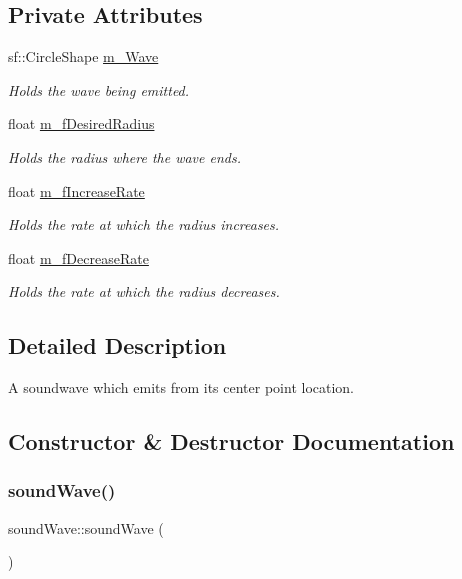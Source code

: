 \subsection*{Private Attributes}
\begin{DoxyCompactItemize}
\item 
sf\+::\+Circle\+Shape \hyperlink{classsound_wave_aeb2707ab18aac662ee8ce8eca9297378}{m\+\_\+\+Wave}
\begin{DoxyCompactList}\small\item\em Holds the wave being emitted. \end{DoxyCompactList}\item 
float \hyperlink{classsound_wave_ac9adfa989210e9baa9ac4aab9a31309a}{m\+\_\+f\+Desired\+Radius}
\begin{DoxyCompactList}\small\item\em Holds the radius where the wave ends. \end{DoxyCompactList}\item 
float \hyperlink{classsound_wave_a6fa457d0d462e86c6be2d36695f9270d}{m\+\_\+f\+Increase\+Rate}
\begin{DoxyCompactList}\small\item\em Holds the rate at which the radius increases. \end{DoxyCompactList}\item 
float \hyperlink{classsound_wave_ab32de1a5ff6f8f64a2ebf05f9707f3d9}{m\+\_\+f\+Decrease\+Rate}
\begin{DoxyCompactList}\small\item\em Holds the rate at which the radius decreases. \end{DoxyCompactList}\end{DoxyCompactItemize}


\subsection{Detailed Description}
A soundwave which emits from its center point location. 

\subsection{Constructor \& Destructor Documentation}
\mbox{\label{classsound_wave_a4936f561d8cf68c073221d2bc4f2e55d}} 
\subsubsection{\texorpdfstring{sound\+Wave()}{soundWave()}\hspace{0.1cm}{\footnotesize\ttfamily [1/2]}}
{\footnotesize\ttfamily sound\+Wave\+::sound\+Wave (\begin{DoxyParamCaption}{ }\end{DoxyParamCaption})}



